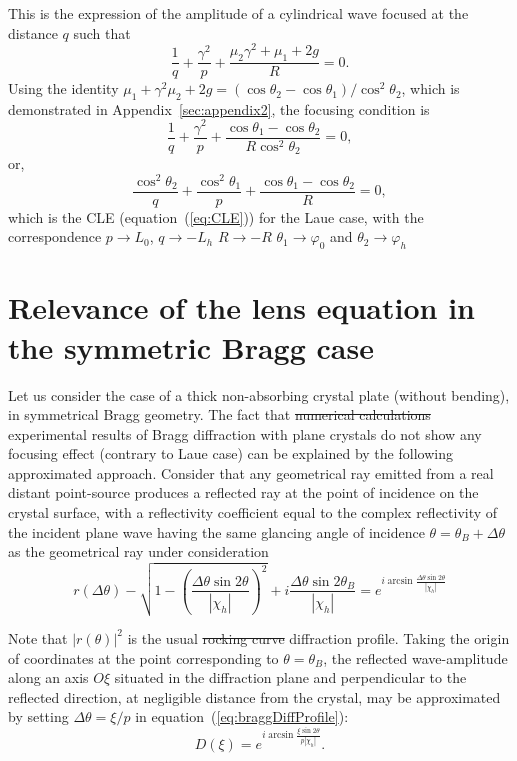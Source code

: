\documentclass[preprint]{iucr}              %
\newcommand{\inred}[1]{{\color{red}#1}}
\begin{document}
This is the expression of the amplitude of a cylindrical wave focused at the distance $q$ such that
\begin{equation}
    \frac{1}{q}+\frac{\gamma^2}{p}+\frac{\mu_2\gamma^2+\mu_1+2g}{R}=0. 
\end{equation}
Using the identity $\mu_1+\gamma^2\mu_2+2g=(\cos\theta_2-\cos\theta_1)/\cos^2\theta_2$, which is demonstrated in Appendix~\ref{sec:appendix2}, the focusing condition is 
\begin{equation}
    \frac{1}{q}+\frac{\gamma^2}{p}+\frac{\cos\theta_1-\cos\theta_2}{R\cos^2\theta_2}=0,
\end{equation}
or,
\begin{equation}
    \frac{\cos^2\theta_2}{q}+\frac{\cos^2\theta_1}{p}+\frac{\cos\theta_1-\cos\theta_2}{R}=0,
\end{equation}
which is the CLE (equation~(\ref{eq:CLE})) for the Laue case, with the correspondence $p \rightarrow L_0$, $q \rightarrow -L_h$ $R \rightarrow -R$ $\theta_1 \rightarrow \varphi_0$ and $\theta_2 \rightarrow \varphi_h$


\section{Relevance of the lens equation in the symmetric Bragg case}
\label{sec:BraggGeometry}
Let us consider the case of a thick non-absorbing {\plane} crystal plate (without bending), in symmetrical Bragg geometry. The fact that \inred{\sout{numerical calculations} experimental results of Bragg diffraction with plane crystals} do not show any focusing effect \inred{(contrary to Laue case)} can be explained by the following approximated approach. Consider that any geometrical ray emitted from a real distant point-source produces a reflected ray at the point of incidence on the crystal surface, with a reflectivity coefficient equal to the complex reflectivity of the incident plane wave having the same glancing angle of incidence $\theta=\theta_B+\Delta\theta$ as the geometrical ray under consideration
\begin{equation}
\label{eq:braggDiffProfile}
    r(\Delta\theta) - \sqrt{1-\left(\frac{\Delta\theta\sin2\theta}{|\chi_h|}\right)^2} + i \frac{\Delta\theta\sin2\theta_B}{|\chi_h|} =
    e^{i \arcsin{\frac{\Delta\theta \sin2\theta}{ |\chi_h|}}}
\end{equation}

Note that $|r(\theta)|^2$ is the usual \inred{\sout{rocking curve} diffraction profile}. Taking the origin of coordinates at the point corresponding to $\theta=\theta_B$, the reflected wave-amplitude along an axis $O\xi$ situated in the diffraction plane and perpendicular to the reflected direction, at negligible distance from the crystal, may be approximated by setting  $\Delta\theta=\xi/p$ in equation~(\ref{eq:braggDiffProfile}):
\begin{equation}
    D(\xi) = e^{i \arcsin{\frac{\xi \sin2\theta}{p |\chi_h|}}}.
\end{equation}
\end{document}
